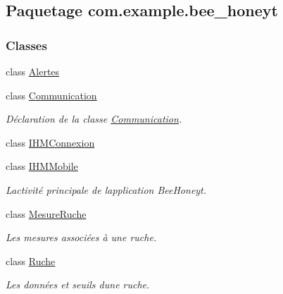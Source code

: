 \hypertarget{namespacecom_1_1example_1_1bee__honeyt}{}\subsection{Paquetage com.\+example.\+bee\+\_\+honeyt}
\label{namespacecom_1_1example_1_1bee__honeyt}
\subsubsection*{Classes}
\begin{DoxyCompactItemize}
\item 
class \hyperlink{classcom_1_1example_1_1bee__honeyt_1_1_alertes}{Alertes}
\item 
class \hyperlink{classcom_1_1example_1_1bee__honeyt_1_1_communication}{Communication}
\begin{DoxyCompactList}\small\item\em Déclaration de la classe \hyperlink{classcom_1_1example_1_1bee__honeyt_1_1_communication}{Communication}. \end{DoxyCompactList}\item 
class \hyperlink{classcom_1_1example_1_1bee__honeyt_1_1_i_h_m_connexion}{I\+H\+M\+Connexion}
\item 
class \hyperlink{classcom_1_1example_1_1bee__honeyt_1_1_i_h_m_mobile}{I\+H\+M\+Mobile}
\begin{DoxyCompactList}\small\item\em L\textquotesingle{}activité principale de l\textquotesingle{}application Bee\+Honey\textquotesingle{}t. \end{DoxyCompactList}\item 
class \hyperlink{classcom_1_1example_1_1bee__honeyt_1_1_mesure_ruche}{Mesure\+Ruche}
\begin{DoxyCompactList}\small\item\em Les mesures associées à une ruche. \end{DoxyCompactList}\item 
class \hyperlink{classcom_1_1example_1_1bee__honeyt_1_1_ruche}{Ruche}
\begin{DoxyCompactList}\small\item\em Les données et seuils d\textquotesingle{}une ruche. \end{DoxyCompactList}\end{DoxyCompactItemize}

